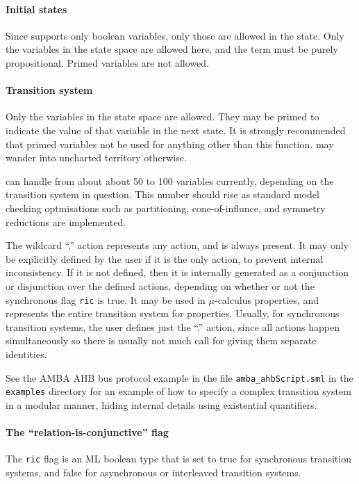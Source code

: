\paragraph{Initial states}

Since \hc{} supports only boolean variables, only those are allowed in the state. Only the variables in the state space are allowed here, and the term must be purely propositional. Primed variables are not allowed.

\paragraph{Transition system}

Only the variables in the state space are allowed. They may be primed to indicate the value of that variable in the next state. It is strongly recommended that primed variables not be used for anything other than this function. \hc{} may wander into uncharted territory otherwise.

\hc{} can handle from about about 50 to 100 variables currently, depending on the transition system in question. This number should rise as standard model checking optmisations such as partitioning, cone-of-influnce, and symmetry reductions are implemented.

The wildcard ``.'' action represents any action, and is always present. It may only be explicitly defined by the user if it is the only action, to prevent internal inconsistency. If it is not defined, then it is internally generated as a conjunction or disjunction over the defined actions, depending on whether or not the synchronous flag \texttt{ric} is true. It may be used in \(\mu\)-calculus properties, and represents the entire transition system for \ctl properties. Usually, for synchronous transition systems, the user defines just the ``.'' action, since all actions happen simultaneously so there is usually not much call for giving them separate identities.

See the AMBA AHB bus protocol example in the file \texttt{amba\_ahbScript.sml} in the \hc{} \texttt{examples} directory for an example of how to specify a complex transition system in a modular manner, hiding internal details using existential quantifiers.

\paragraph{The ``relation-is-conjunctive'' flag} The \texttt{ric} flag is an ML boolean type that is set to true for synchronous transition systems, and false for asynchronous or interleaved transition systems.


